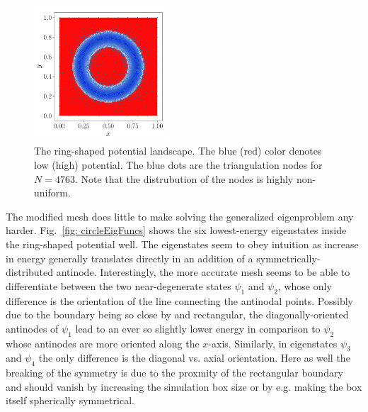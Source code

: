 \documentclass[a4paper,12pt]{article}
\begin{document}
\begin{figure}
\vspace{-20pt}
\hspace{-30pt}
\begin{center}
\includegraphics[width=0.45\textwidth]{../figs/circle_pot.pdf}
\caption{The ring-shaped potential landscape. The blue (red) color denotes low (high) potential. The blue dots are the triangulation nodes for $N=4763$. Note that the distrubution of the nodes is highly non-uniform. }
\label{fig: circlePot}
\end{center}
\end{figure}

The modified mesh does little to make solving the generalized eigenproblem any harder. Fig.~\ref{fig: circleEigFuncs} shows the six lowest-energy eigenstates inside the ring-shaped potential well. The eigenstates seem to obey intuition as increase in energy generally translates directly in an addition of a symmetrically-distributed antinode. Interestingly, the more accurate mesh seems to be able to differentiate between the two near-degenerate states $\psi_1$ and $\psi_2$, whose only difference is the orientation of the line connecting the antinodal points. Possibly due to the boundary being so close by and rectangular, the diagonally-oriented antinodes of $\psi_1$ lead to an ever so slightly lower energy in comparison to $\psi_2$ whose antinodes are more oriented along the $x$-axis. Similarly, in eigenstates $\psi_3$ and $\psi_4$ the only difference is the diagonal vs. axial orientation. Here as well the breaking of the symmetry is due to the proxmity of the rectangular boundary and should vanish by increasing the simulation box size or by e.g. making the box itself spherically symmetrical.
\end{document}
